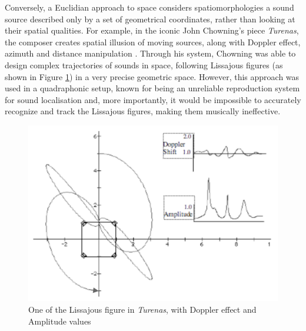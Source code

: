 \documentclass{article}
\begin{document}
Conversely, a Euclidian approach to space considers spatiomorphologies a sound source described only by a set of geometrical coordinates, rather than looking at their spatial qualities. For example, in the iconic John Chowning's piece \textit{Turenas}, the composer creates spatial illusion of moving sources, along with Doppler effect, azimuth and distance manipulation \cite{Chowning2011}. Through his system, Chowning was able to design complex trajectories of sounds in space,  following Lissajous figures (as shown in Figure \ref{fig:turenas}) in a very precise geometric space. However, this approach was used in a quadraphonic setup, known for being an unreliable reproduction system for sound localisation and, more importantly, it would be impossible to accurately recognize and track the Lissajous figures, making them musically ineffective. 
        \begin{figure}[t]
		\centering
		\includegraphics[width=1\columnwidth]{SMC_2024_Paper/Turenas.png}
		\caption{One of the Lissajous figure in \textit{Turenas}, with Doppler effect and Amplitude values\cite{Chowning2011}\label{fig:turenas}}
	\end{figure}  
\end{document}
